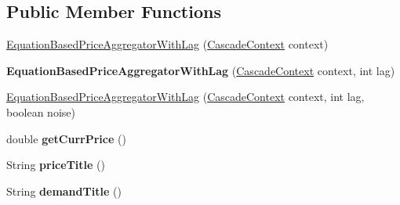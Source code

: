 \subsection*{Public Member Functions}
\begin{DoxyCompactItemize}
\item 
\hyperlink{classuk_1_1ac_1_1dmu_1_1iesd_1_1cascade_1_1agents_1_1aggregators_1_1_equation_based_price_aggregator_with_lag_ace0902cfe7122e7cce2dd14b2689c0f0}{Equation\-Based\-Price\-Aggregator\-With\-Lag} (\hyperlink{classuk_1_1ac_1_1dmu_1_1iesd_1_1cascade_1_1context_1_1_cascade_context}{Cascade\-Context} context)
\item 
\hypertarget{classuk_1_1ac_1_1dmu_1_1iesd_1_1cascade_1_1agents_1_1aggregators_1_1_equation_based_price_aggregator_with_lag_a1402f01dcf2f4820f527486f70448571}{{\bfseries Equation\-Based\-Price\-Aggregator\-With\-Lag} (\hyperlink{classuk_1_1ac_1_1dmu_1_1iesd_1_1cascade_1_1context_1_1_cascade_context}{Cascade\-Context} context, int lag)}\label{classuk_1_1ac_1_1dmu_1_1iesd_1_1cascade_1_1agents_1_1aggregators_1_1_equation_based_price_aggregator_with_lag_a1402f01dcf2f4820f527486f70448571}

\item 
\hyperlink{classuk_1_1ac_1_1dmu_1_1iesd_1_1cascade_1_1agents_1_1aggregators_1_1_equation_based_price_aggregator_with_lag_a533aac4ff983094e6d7f6a4496188458}{Equation\-Based\-Price\-Aggregator\-With\-Lag} (\hyperlink{classuk_1_1ac_1_1dmu_1_1iesd_1_1cascade_1_1context_1_1_cascade_context}{Cascade\-Context} context, int lag, boolean noise)
\item 
\hypertarget{classuk_1_1ac_1_1dmu_1_1iesd_1_1cascade_1_1agents_1_1aggregators_1_1_equation_based_price_aggregator_with_lag_a961a4e831e6d8c545aa5a62f9348c6dc}{double {\bfseries get\-Curr\-Price} ()}\label{classuk_1_1ac_1_1dmu_1_1iesd_1_1cascade_1_1agents_1_1aggregators_1_1_equation_based_price_aggregator_with_lag_a961a4e831e6d8c545aa5a62f9348c6dc}

\item 
\hypertarget{classuk_1_1ac_1_1dmu_1_1iesd_1_1cascade_1_1agents_1_1aggregators_1_1_equation_based_price_aggregator_with_lag_a9ab2e421fe6af2ada4f2abd5213a43dc}{String {\bfseries price\-Title} ()}\label{classuk_1_1ac_1_1dmu_1_1iesd_1_1cascade_1_1agents_1_1aggregators_1_1_equation_based_price_aggregator_with_lag_a9ab2e421fe6af2ada4f2abd5213a43dc}

\item 
\hypertarget{classuk_1_1ac_1_1dmu_1_1iesd_1_1cascade_1_1agents_1_1aggregators_1_1_equation_based_price_aggregator_with_lag_af25a1adfaa454ebf9a31dcea2e604286}{String {\bfseries demand\-Title} ()}\label{classuk_1_1ac_1_1dmu_1_1iesd_1_1cascade_1_1agents_1_1aggregators_1_1_equation_based_price_aggregator_with_lag_af25a1adfaa454ebf9a31dcea2e604286}


\end{DoxyCompactItemize}
